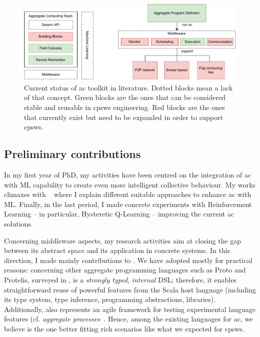 \documentclass[11pt]{article}
\begin{document}
\begin{figure}[t]
	\centering
	\includegraphics[width=\textwidth]{img/to-do-for-thesis.pdf}
	\caption{Current status of \ac{ac} toolkit in literature. Dotted blocks mean a lack of that concept. Green blocks are the ones that can be considered stable and reusable in \acp{cpsw} engineering. Red blocks are the ones that currently exist but need to be expanded in order to support \acp{cpsw}.}
	\label{fig:current-state}
\end{figure}
\subsection{Preliminary contributions}
In my first year of PhD, my activities have been centred on
the integration of \ac{ac} with ML capability to create even more
intelligent collective behaviour. 
%
My works climaxes with ~\cite{research} where I explain different suitable approaches to
enhance \ac{ac} with ML. Finally, in the last period, I made concrete
experiments with Reinforcement Learning -- in particular, Hysteretic Q-Learning \cite{hysteretic-q} -- improving the current \ac{ac} solutions.

Concerning middleware aspects, my research activities aim at closing the gap between
its abstract space and its application in concrete systems. In this direction, I made mainly contributions to \scafi{}.
%
We have adopted \scafi{} mostly for practical reasons: concerning other aggregate programming languages such as Proto and Protelis, surveyed in \cite{viroli2019jlamp-si-coord},
\scafi{} is a \emph{strongly typed}, \emph{internal} DSL; therefore, it enables straightforward reuse of powerful features from the Scala host language (including its type system, type inference, programming abstractions, libraries).
%
Additionally, \scafi{} also represents an agile framework for testing experimental language features (cf. \emph{aggregate processes}~\cite{DBLP:journals/eaai/CasadeiVAPD21}.
%
Hence, among the existing languages for \ac{ac}, we believe \scafi{} is the one better fitting rich scenarios like what we expected for \acp{cpsw}.
\end{document}
